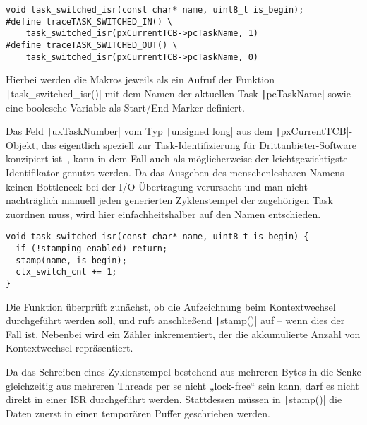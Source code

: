 \begin{code}
\begin{verbatim}
void task_switched_isr(const char* name, uint8_t is_begin);
#define traceTASK_SWITCHED_IN() \
    task_switched_isr(pxCurrentTCB->pcTaskName, 1)
#define traceTASK_SWITCHED_OUT() \
    task_switched_isr(pxCurrentTCB->pcTaskName, 0)
\end{verbatim}
\end{code}

Hierbei werden die Makros jeweils als ein Aufruf der Funktion
\texttt|task_switched_isr()| mit dem Namen der aktuellen Task
\texttt|pcTaskName| sowie eine boolesche Variable als Start/End-Marker
definiert.

Das Feld \texttt|uxTaskNumber| vom Typ \texttt|unsigned long|
aus dem \texttt|pxCurrentTCB|-Objekt, das eigentlich speziell zur
Task-Identifizierung für Drittanbieter-Software konzipiert
ist~\cite{freertos_task_c_410}, kann in dem Fall auch als möglicherweise der
leichtgewichtigste Identifikator genutzt werden. Da das Ausgeben des
menschenlesbaren Namens keinen Bottleneck bei der I/O-Übertragung verursacht und
man nicht nachträglich manuell jeden generierten Zyklenstempel der zugehörigen
Task zuordnen muss, wird hier einfachheitshalber auf den Namen entschieden.

\begin{code}
\begin{verbatim}
void task_switched_isr(const char* name, uint8_t is_begin) {
  if (!stamping_enabled) return;
  stamp(name, is_begin);
  ctx_switch_cnt += 1;
}
\end{verbatim}
\end{code}

Die Funktion überprüft zunächst, ob die Aufzeichnung beim Kontextwechsel
durchgeführt werden soll, und ruft anschließend \texttt|stamp()| auf --
wenn dies der Fall ist. Nebenbei wird ein Zähler inkrementiert, der die
akkumulierte Anzahl von Kontextwechsel repräsentiert.

Da das Schreiben eines Zyklenstempel bestehend aus mehreren Bytes in die Senke
gleichzeitig aus mehreren Threads per se nicht „lock-free“ sein kann, darf es
nicht direkt in einer ISR durchgeführt werden. Stattdessen müssen in
\texttt|stamp()| die Daten zuerst in einen temporären Puffer
geschrieben werden.

